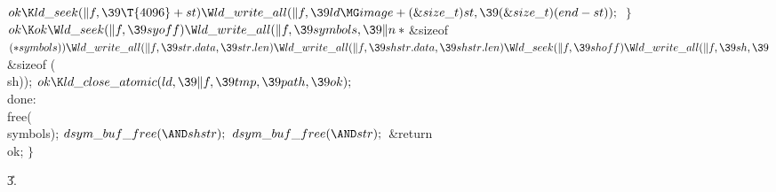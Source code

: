 ${}\\{ok}\K\\{ld\_seek}(\|f,\39\T{4096}+\\{st})\W\\{ld\_write\_all}(\|f,\39%
\\{ld}\MG\\{image}+(\&{size\_t})\,\\{st},\39(\&{size\_t})(\\{end}-\\{st}));{}$%
\2\6
\4${}\}{}$\2\6
${}\\{ok}\K\\{ok}\W\\{ld\_seek}(\|f,\39\\{syoff})\W\\{ld\_write\_all}(\|f,\39%
\\{symbols},\39\|n*{}$\&{sizeof} ${}({*}\\{symbols}))\W\\{ld\_write\_all}(\|f,%
\39\\{str}.\\{data},\39\\{str}.\\{len})\W\\{ld\_write\_all}(\|f,\39\\{shstr}.%
\\{data},\39\\{shstr}.\\{len})\W\\{ld\_seek}(\|f,\39\\{shoff})\W\\{ld\_write%
\_all}(\|f,\39\\{sh},\39{}$\&{sizeof} (\\{sh}));\6
${}\\{ok}\K\\{ld\_close\_atomic}(\\{ld},\39\|f,\39\\{tmp},\39\\{path},\39%
\\{ok});{}$\6
\4\\{done}:\5
\\{free}(\\{symbols});\6
${}\\{dsym\_buf\_free}({\AND}\\{shstr});{}$\6
${}\\{dsym\_buf\_free}({\AND}\\{str});{}$\6
\&{return} \\{ok}; $\}{}$\par
\U3.\fi


\fi


\inx
\fin
\con
